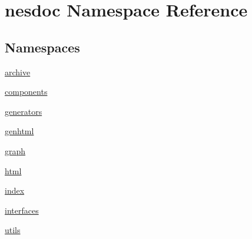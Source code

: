 \hypertarget{namespacenesdoc}{}\section{nesdoc Namespace Reference}
\label{namespacenesdoc}
\subsection*{Namespaces}
\begin{DoxyCompactItemize}
\item 
 \hyperlink{namespacenesdoc_1_1archive}{archive}
\item 
 \hyperlink{namespacenesdoc_1_1components}{components}
\item 
 \hyperlink{namespacenesdoc_1_1generators}{generators}
\item 
 \hyperlink{namespacenesdoc_1_1genhtml}{genhtml}
\item 
 \hyperlink{namespacenesdoc_1_1graph}{graph}
\item 
 \hyperlink{namespacenesdoc_1_1html}{html}
\item 
 \hyperlink{namespacenesdoc_1_1index}{index}
\item 
 \hyperlink{namespacenesdoc_1_1interfaces}{interfaces}
\item 
 \hyperlink{namespacenesdoc_1_1utils}{utils}
\end{DoxyCompactItemize}

